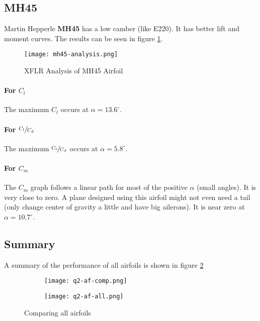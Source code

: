 \subsection{MH45}
Martin Hepperle \textbf{MH45} has a low camber (like E220). It has better lift and moment curves. The results can be seen in figure \ref{fig:mh45-analysis}.

\begin{figure}[ht]
    \centering
    \texttt{[image: mh45-analysis.png]}
    \caption{XFLR Analysis of MH45 Airfoil}
    \label{fig:mh45-analysis}
\end{figure}

\paragraph{For $C_l$}
The maximum $C_l$ occurs at $\alpha=13.6^\circ$.

\paragraph{For $\sfrac{C_l}{C_d}$}
The maximum $\sfrac{C_l}{C_d}$ occurs at $\alpha = 5.8^\circ$.

\paragraph{For $C_m$}
The $C_m$ graph follows a linear path for most of the positive $\alpha$ (small angles). It is very close to zero. A plane designed using this airfoil might not even need a tail (only change center of gravity a little and have big ailerons). It is near zero at $\alpha = 10.7^\circ$.

\subsection*{Summary}

A summary of the performance of all airfoils is shown in figure \ref{fig:q2-af-comp}

\begin{figure}[ht]
    \centering
    \begin{subfigure}[b]{0.45\textwidth}
        \texttt{[image: q2-af-comp.png]}
    \end{subfigure}
    \begin{subfigure}[b]{0.45\textwidth}
        \texttt{[image: q2-af-all.png]}
    \end{subfigure}
    \caption{Comparing all airfoils}
    \label{fig:q2-af-comp}
\end{figure}
